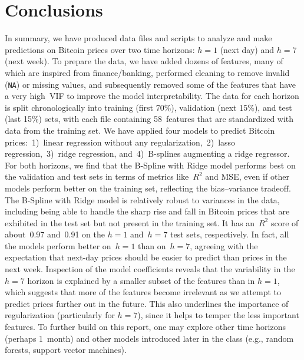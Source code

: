 \documentclass{article}
\begin{document}
\section{Conclusions}
\label{sec:conclusions}

In summary, we have produced data files and scripts to analyze and make predictions on Bitcoin prices over two time horizons: $h=1$ (next day) and $h=7$ (next week). To prepare the data, we have added dozens of features, many of which are inspired from finance/banking, performed cleaning to remove invalid (\texttt{NA}) or missing values, and subsequently removed some of the features that have a very high~VIF to improve the model interpretability. The data for each horizon is split chronologically into training (first 70\%), validation (next 15\%), and test (last 15\%) sets, with each file containing 58~features that are standardized with data from the training set. We have applied four models to predict Bitcoin prices:~1)~linear regression without any regularization,~2)~lasso regression,~3)~ridge regression, and~4)~B-splines augmenting a ridge regressor. For both horizons, we find that the B-Spline with Ridge model performs best on the validation and test sets in terms of metrics like~$R^2$ and MSE, even if other models perform better on the training set, reflecting the bias--variance tradeoff. The B-Spline with Ridge model is relatively robust to variances in the data, including being able to handle the sharp rise and fall in Bitcoin prices that are exhibited in the test set but not present in the training set. It has an~$R^2$ score of about~0.97 and~0.91 on the $h=1$ and~$h=7$ test sets, respectively. In fact, all the models perform better on~$h=1$ than on~$h=7$, agreeing with the expectation that next-day prices should be easier to predict than prices in the next week. Inspection of the model coefficients reveals that the variability in the $h=7$ horizon is explained by a smaller subset of the features than in $h=1$, which suggests that more of the features become irrelevant as we attempt to predict prices further out in the future. This also underlines the importance of regularization (particularly for $h=7$), since it helps to temper the less important features. To further build on this report, one may explore other time horizons (perhaps 1~month) and other models introduced later in the class (e.g., random forests, support vector machines).
\end{document}
